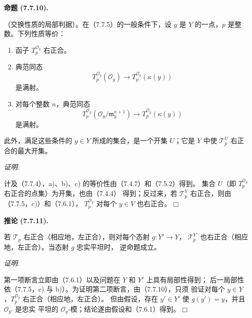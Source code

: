 \documentclass[UTF8,fontset=none,11pt,oneside,openany]{ctexbook}
\providecommand{\square}{\mdlgwhtsquare}
\newenvironment{proposition}[1][]{%
  \par\medskip\noindent\textbf{命题 (#1).}\ %
}{\par}
\newenvironment{corollary}[1][]{%
  \par\medskip\noindent\textbf{推论 (#1).}\ %
}{\par}
\newenvironment{proof}{%
  \par\smallskip\noindent\textit{证明.}\ %
}{\hfill$\square$\par}
\newcommand{\oldpage}[2][]{%
  \hypertarget{ega-source-page-#1-#2}{}%
  \marginnote{\scriptsize\textbf{#1}~|~#2}\ignorespaces}
\begin{document}
\begin{proposition}[7.7.10]
\textnormal{（交换性质的局部判据）。}在（7.7.5）的一般条件下，设 $y$
是 $Y$ 的一点，$p$ 是整数。下列性质等价：
\begin{enumerate}
  \item[a)] 函子 $T_p^{\mathscr O_y}$ 右正合。

  \item[b)] 典范同态
    \[
      T_p^{\mathscr O_y}(\mathscr O_y)
      \longrightarrow
      T_p^{\mathscr O_y}(\kappa(y))
    \]
    是满射。

  \item[c)] 对每个整数 $n$，典范同态
    \[
      T_p^{\mathscr O_y}
      (\mathscr O_y/\mathfrak m_y^{n+1})
      \longrightarrow
      T_p^{\mathscr O_y}(\kappa(y))
    \]
    是满射。
\end{enumerate}
此外，满足这些条件的 $y\in Y$ 所成的集合，是一个开集 $U$；它是 $Y$
中使 $\mathscr T_p^U$ 右正合的最大开集。
\end{proposition}

\begin{proof}
计及（7.7.4），a)、b)、c) 的等价性由（7.4.7）和（7.5.2）得到。
集合 $U$（即 $T_p^{\mathscr O_y}$ 右正合的点集）为开集，也由（7.4.4）
得到；反过来，若 $\mathscr T_p^V$ 右正合，则由（7.7.5，c)）和（7.6.1），
$T_p^{\mathscr O_y}$ 对每个 $y\in V$ 也右正合。
\end{proof}

\begin{corollary}[7.7.11]
若 $\mathscr T_p$ 右正合（相应地，左正合），则对每个态射 $g:Y'\to Y$，
$\mathscr T_p^{Y'}$ 也右正合（相应地，左正合）。当态射 $g$ 忠实平坦时，
逆命题成立。
\end{corollary}

\oldpage[III]{204}
\begin{proof}
第一项断言立即由（7.6.1）以及问题在 $Y$ 和 $Y'$ 上具有局部性得到；
后一局部性依（7.7.5，c) 与 b)）。为证明第二项断言，由（7.7.10），只须
验证对每个 $y\in Y$，$T_p^{\mathscr O_y}$ 右正合（相应地，左正合）。
但由假设，存在 $y'\in Y'$ 使 $g(y')=y$，并且 $\mathscr O_{y'}$ 是忠实
平坦的 $\mathscr O_y$-模；结论遂由假设和（7.6.1）得到。
\end{proof}
\end{document}
